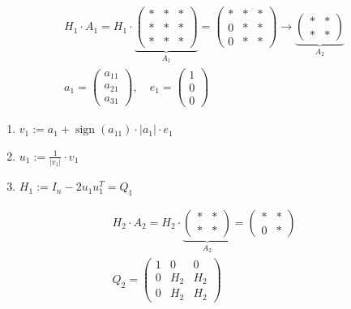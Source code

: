 \documentclass[10pt]{article}
\begin{document}
$$
\begin{gathered}
H_{1} \cdot A_{1}=H_{1} \cdot \underbrace{\left(\begin{array}{lll}
* & * & * \\
* & * & * \\
* & * & *
\end{array}\right)}_{A_{1}}=\left(\begin{array}{lll}
* & * & * \\
0 & * & * \\
0 & * & *
\end{array}\right) \rightarrow \underbrace{\left(\begin{array}{cc}
* & * \\
* & *
\end{array}\right)}_{A_{2}} \\
a_{1}=\left(\begin{array}{l}
a_{11} \\
a_{21} \\
a_{31}
\end{array}\right), \quad e_{1}=\left(\begin{array}{l}
1 \\
0 \\
0
\end{array}\right)
\end{gathered}
$$

\begin{enumerate}
  \item $v_{1}:=a_{1}+\operatorname{sign}\left(a_{11}\right) \cdot\left|a_{1}\right| \cdot e_{1}$
  \item $u_{1}:=\frac{1}{\left|v_{1}\right|} \cdot v_{1}$
  \item $H_{1}:=I_{n}-2 u_{1} u_{1}^{T}=Q_{1}$
\end{enumerate}

$$
\begin{gathered}
H_{2} \cdot A_{2}=H_{2} \cdot \underbrace{\left(\begin{array}{ll}
* & * \\
* & *
\end{array}\right)}_{A_{2}}=\left(\begin{array}{ll}
* & * \\
0 & *
\end{array}\right) \\
Q_{2}=\left(\begin{array}{ccc}
1 & 0 & 0 \\
0 & H_{2} & H_{2} \\
0 & H_{2} & H_{2}
\end{array}\right)
\end{gathered}
$$
\end{document}
